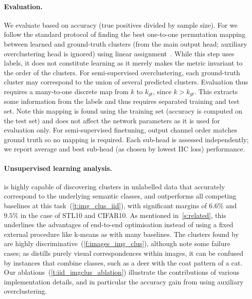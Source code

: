 \paragraph{Evaluation.}
We evaluate based on accuracy (true positives divided by sample size). For \methodnameshort we follow the standard protocol of finding the best one-to-one permutation mapping between learned and ground-truth clusters (from the main output head; auxiliary overclustering head is ignored) using linear assignment~\cite{kuhn2010hungarian}. While this step uses labels, it does not constitute learning as it merely makes the metric invariant to the order of the clusters.
For semi-supervised overclustering, each ground-truth cluster may correspond to the union of several predicted clusters.
Evaluation thus requires a many-to-one discrete map from $k$ to $k_{gt}$, since $k > k_{gt}$. This extracts some information from the labels and thus requires separated training and test set. Note this mapping is found using the training set (accuracy is computed on the test set) and does not affect the network parameters as it is used for evaluation only.
For semi-supervised finetuning, output channel order matches ground truth so no mapping is required.
Each sub-head is assessed independently; we report average and best sub-head (as chosen by lowest IIC loss) performance.

\paragraph{Unsupervised learning analysis.}
\methodnameshort is highly capable of discovering clusters in unlabelled data that accurately correspond to the underlying semantic classes, and outperforms all competing baselines at this task~(\cref{t:img_clus_iid}), with significant margins of $6.6\%$ and $9.5\%$ in the case of STL10 and CIFAR10. As mentioned in~\cref{s:related}, this underlines the advantages of end-to-end optimisation instead of using a fixed external procedure like k-means as with many baselines. The clusters found by \methodnameshort are highly discriminative~(\cref{f:images_img_clus}), although note some failure cases; as \methodnameshort distills purely visual correspondences within images, it can be confused by instances that combine classes, such as a deer with the coat pattern of a cat. Our ablations~(\cref{t:iid_imgclus_ablation}) illustrate the contributions of various implementation details, and in particular the accuracy gain from using auxiliary overclustering.

